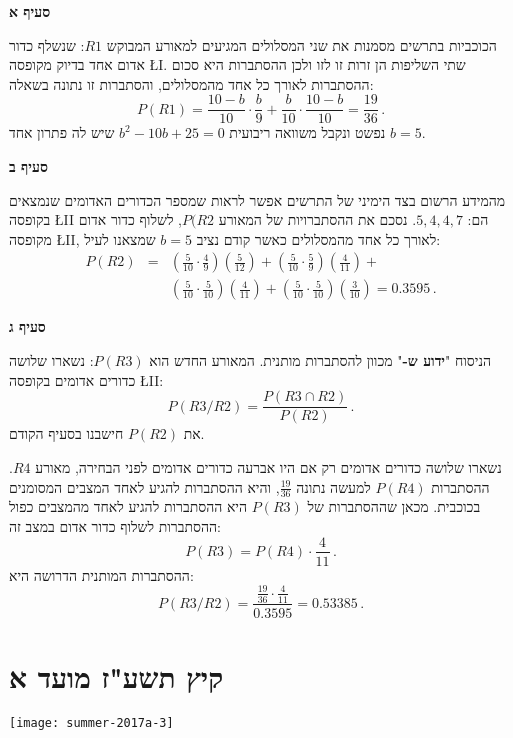 \textbf{סעיף א}

הכוכביות בתרשים מסמנות את שני המסלולים המגיעים למאורע המבוקש 
$R1$:
שנשלף כדור אדום אחד בדיוק מקופסה
\L{I}.
שתי השליפות הן זרות זו לזו ולכן ההסתברות היא סכום ההסתברות לאורך כל אחד מהמסלולים, והסתברות זו נתונה בשאלה:
\[
P(R1)=\frac{10-b}{10}\cdot\frac{b}{9} + \frac{b}{10}\cdot\frac{10-b}{10} = \frac{19}{36}\,.
\]
נפשט ונקבל משוואה ריבועית 
$b^2-10b+25=0$
שיש לה פתרון אחד
$b=5$.


\textbf{סעיף ב}

מהמידע הרשום בצד הימיני של התרשים אפשר לראות שמספר הכדורים האדומים שנמצאים בקופסה
\L{II}
הם:
$5,4,4,7$.
נסכם את ההסתברויות של המאורע
$P(R2$,
לשלוף כדור אדום מקופסה
\L{II},
לאורך כל אחד מהמסלולים כאשר קודם נציב 
$b=5$
שמצאנו לעיל:
\[
\begin{array}{rcl}
P(R2)&=&\displaystyle\left(\frac{5}{10}\cdot\frac{4}{9}\right)\left(\frac{5}{12}\right)+
\left(\frac{5}{10}\cdot\frac{5}{9}\right)\left(\frac{4}{11}\right)+\\
&&\displaystyle\left(\frac{5}{10}\cdot\frac{5}{10}\right)\left(\frac{4}{11}\right)+
\left(\frac{5}{10}\cdot\frac{5}{10}\right)\left(\frac{3}{10}\right)
=0.3595\,.
\end{array}
\]

\textbf{סעיף ג}

הניסוח
"\textbf{ידוע ש-}"
מכוון להסתברות מותנית. המאורע החדש הוא
$P(R3)$:
נשארו שלושה כדורים אדומים בקופסה 
\L{II}:
\[
P(R3/R2)=\frac{P(R3\cap R2)}{P(R2)}\,.
\]
את
$P(R2)$
חישבנו בסעיף הקודם.

נשארו שלושה כדורים אדומים רק אם היו אברעה כדורים אדומים לפני הבחירה, מאורע 
$R4$.
ההסתברות 
$P(R4)$
למעשה נתונה
$\frac{19}{36}$,
והיא ההסתברות להגיע לאחד המצבים המסומנים בכוכבית. מכאן שההסתברות של 
$P(R3)$
היא ההסתברות להגיע לאחד מהמצבים כפול ההסתברות לשלוף כדור אדום במצב זה:
\[
P(R3)=P(R4)\cdot \textstyle\frac{4}{11}\,.
\]
ההסתברות המותנית הדרושה היא:
\[
P(R3/R2)=\frac{\frac{19}{36}\cdot\frac{4}{11}}{0.3595}=0.53385\,.
\]


\section{קיץ תשע"ז מועד א}

\begin{center}
\texttt{[image: summer-2017a-3]}
\end{center}

